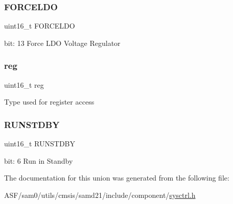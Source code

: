 \subsubsection{\texorpdfstring{FORCELDO}{FORCELDO}}
{\footnotesize\ttfamily uint16\+\_\+t F\+O\+R\+C\+E\+L\+DO}

bit\+: 13 Force L\+DO Voltage Regulator \mbox{\label{union_s_y_s_c_t_r_l___v_r_e_g___type_a11760f5020019f4aa8cb02e694f7cc44}} 
\subsubsection{\texorpdfstring{reg}{reg}}
{\footnotesize\ttfamily uint16\+\_\+t reg}

Type used for register access \mbox{\label{union_s_y_s_c_t_r_l___v_r_e_g___type_a0a98954fc108f309f3232355e809617b}} 
\subsubsection{\texorpdfstring{RUNSTDBY}{RUNSTDBY}}
{\footnotesize\ttfamily uint16\+\_\+t R\+U\+N\+S\+T\+D\+BY}

bit\+: 6 Run in Standby 

The documentation for this union was generated from the following file\+:\begin{DoxyCompactItemize}
\item 
A\+S\+F/sam0/utils/cmsis/samd21/include/component/\mbox{\hyperlink{component_2sysctrl_8h}{sysctrl.\+h}}\end{DoxyCompactItemize}
